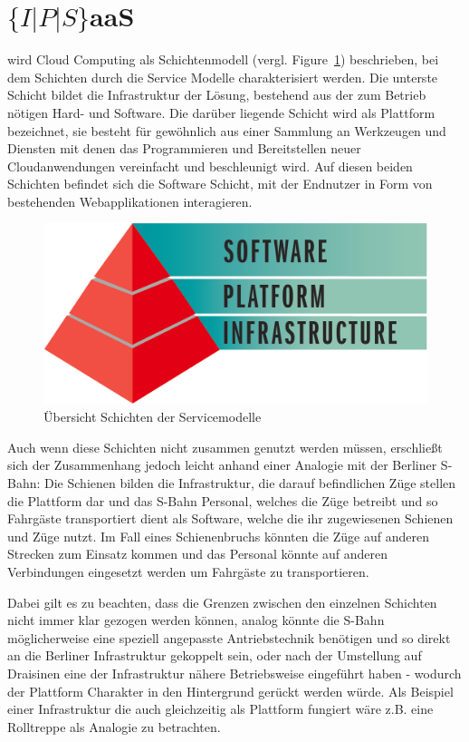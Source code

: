 \section{$\{I|P|S\}$aaS}
\label{sec_service_models}

 wird Cloud Computing als Schichtenmodell (vergl. Figure~\ref{fig:serviceModels}) beschrieben, bei dem Schichten durch die Service Modelle charakterisiert werden. Die unterste Schicht bildet die Infrastruktur der Lösung, bestehend aus der zum Betrieb nötigen Hard- und Software. Die darüber liegende Schicht wird als Plattform bezeichnet, sie besteht für gewöhnlich aus einer Sammlung an Werkzeugen und Diensten mit denen das Programmieren und Bereitstellen neuer Cloudanwendungen vereinfacht und beschleunigt wird. Auf diesen beiden Schichten befindet sich die Software Schicht, mit der Endnutzer in Form von bestehenden Webapplikationen interagieren.

\begin{figure}
	\centering
	\includegraphics[width=0.8\linewidth]{images/serviceModels}
	\caption{Übersicht Schichten der Servicemodelle}
	\label{fig:serviceModels}
\end{figure}

Auch wenn diese Schichten nicht zusammen genutzt werden müssen, erschließt sich der Zusammenhang jedoch leicht anhand einer Analogie mit der Berliner S-Bahn: Die Schienen bilden die Infrastruktur, die darauf befindlichen Züge stellen die Plattform dar und das S-Bahn Personal, welches die Züge betreibt und so Fahrgäste transportiert dient als Software, welche die ihr zugewiesenen Schienen und Züge nutzt. Im Fall eines Schienenbruchs könnten die Züge auf anderen Strecken zum Einsatz kommen und das Personal könnte auf anderen Verbindungen eingesetzt werden um Fahrgäste zu transportieren.

Dabei gilt es zu beachten, dass die Grenzen zwischen den einzelnen Schichten nicht immer klar gezogen werden können, analog könnte die S-Bahn möglicherweise eine speziell angepasste Antriebstechnik benötigen und so direkt an die Berliner Infrastruktur gekoppelt sein, oder nach der Umstellung auf Draisinen eine der Infrastruktur nähere Betriebsweise eingeführt haben - wodurch der Plattform Charakter in den Hintergrund gerückt werden würde. Als Beispiel einer Infrastruktur die auch gleichzeitig als Plattform fungiert wäre z.B. eine Rolltreppe als Analogie zu betrachten.

